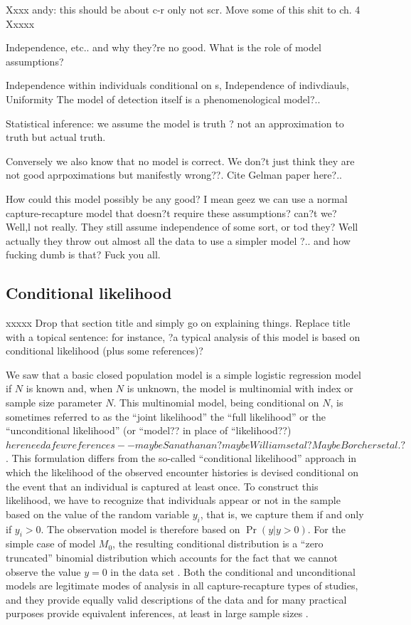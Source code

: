 Xxxx andy: this should be about c-r only not scr. Move some of this shit to ch. 4 
Xxxxx

Independence, etc.. and why they?re no good. What is the role of model assumptions?

Independence within individuals conditional on s,
Independence of indivdiauls, 
Uniformity
The model of detection itself is a phenomenological model?..

Statistical inference: we assume the model is truth ? not an approximation to truth but actual truth.

Conversely we also know that no model is correct. We don?t just think they are not good aprpoximations but manifestly wrong??. Cite Gelman paper here?..


How could this model possibly be any good? I mean geez we can use a normal capture-recapture model that doesn?t require these assumptions? can?t we? Well,l not really. They still assume independence of some sort, or tod they? Well actually they throw out almost all the data to use a simpler model ?.. and how fucking dumb is that? Fuck you all. 

\subsection{Conditional likelihood}

 xxxxx  Drop that section title and simply go on explaining things. Replace title with a topical sentence: for instance, ?a typical analysis of this model is based on conditional likelihood (plus some references)?

We saw that a basic closed population model is a simple logistic
regression model if $N$ is known and, when $N$ is unknown, the model
is multinomial with index or sample size parameter $N$. This
multinomial model, being conditional on $N$, is sometimes referred to
as the ``joint likelihood'' the ``full likelihood'' or the
``unconditional likelihood'' (or ``model?? in place of ``likelihood??) $here need a few references  -- maybe Sanathanan ? maybe Williams et al?  Maybe Borchers et al.?     $. This
formulation differs from the so-called ``conditional likelihood''
approach in which the likelihood of the observed encounter histories
is devised conditional on the event that an individual is captured at
least once.  To construct this likelihood, we have to recognize that
individuals appear or not in the sample based on the value of the
random variable $y_{i}$, that is, we capture them if and only if
$y_{i}>0$.  The observation model is therefore based on $\Pr(y|y>0)$.
For the simple case of model $M_0$, the resulting conditional
distribution is a ``zero truncated'' binomial distribution which
accounts for the fact that we cannot observe the value $y=0$ in the
data set \citep[see][sec. 5.1]{royle_dorazio:2008}.  Both the
conditional and unconditional models are legitimate modes of analysis
in all capture-recapture types of studies, and they provide equally
valid descriptions of the data and for many practical purposes provide
equivalent inferences, at least in large sample sizes
\citep{sanathanan:1972}.

